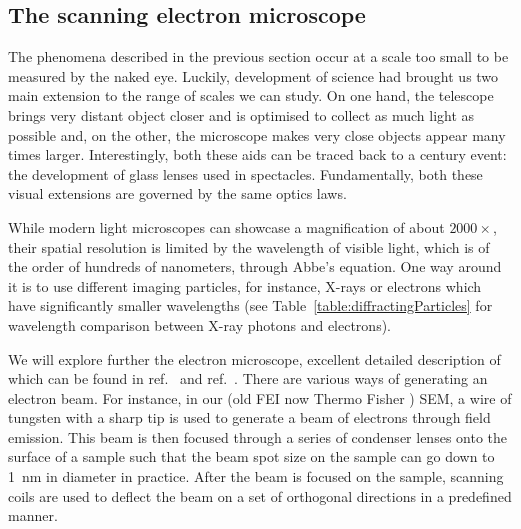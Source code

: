 \subsection{The scanning electron microscope}
\label{sec:sem}
The phenomena described in the previous section occur at a scale too small to be measured by the naked eye. Luckily,  development of science had brought us two main extension  to the range of scales we can study. On one hand,  the telescope brings very distant object closer and is optimised to collect as much light as possible and, on the other, the microscope makes very close objects appear many times larger.
Interestingly, both these aids can be traced back to a  century event: the development of glass lenses used in spectacles. Fundamentally, both these visual extensions are governed by the same optics laws. 

While modern light microscopes can showcase a magnification of about $2000\times$, their spatial resolution is limited by the wavelength of visible light, which is of the order of hundreds of nanometers, through Abbe's equation. One way around it is to use  different imaging particles, for instance, X-rays or electrons which have significantly smaller wavelengths (see Table~\ref{table:diffractingParticles} for wavelength comparison between X-ray photons and electrons).   

We will explore further the electron microscope, excellent detailed description of which can be found in ref.~\cite{Hearle72} and ref.~\cite{Reimer13}. There are various ways of generating an electron beam. For instance, in our (old FEI now Thermo Fisher ) SEM, a wire of tungsten with a sharp tip is used to generate a beam of electrons through field emission. This beam is then focused through a series of condenser lenses onto the surface of a sample such that the beam spot size on the sample can go down to  \SI{1}{\nano \meter} in diameter in practice.  After the beam is focused on the sample, scanning coils are used to deflect the beam on a set of orthogonal directions in a predefined manner. 


